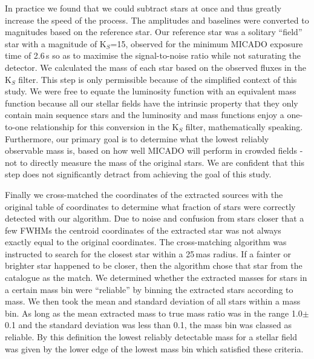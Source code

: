 In practice we found that we could subtract  stars at once and thus greatly increase the speed of the process. 
The amplitudes and baselines were converted to magnitudes based on the reference star. 
Our reference star was a solitary ``field'' star with a magnitude of K$_S$=15, observed for the minimum {MICADO} exposure time of 2.6\,s so as to maximise the signal-to-noise ratio while not saturating the detector. 
We calculated the mass of each star based on the observed fluxes in the K$_S$ filter. 
This step is only permissible because of the simplified context of this study. 
We were free to equate the luminosity function with an equivalent mass function because all our stellar fields have the intrinsic property that they only contain main sequence stars and the luminosity and mass functions enjoy a one-to-one relationship for this conversion in the K$_S$ filter, mathematically speaking. 
Furthermore, our primary goal is to determine what the lowest reliably observable mass is, based on how well MICADO will perform in crowded fields - not to directly measure the mass of the original stars. 
We are confident that this step does not significantly detract from achieving the goal of this study.


Finally we cross-matched the coordinates of the extracted sources with the original table of coordinates to determine what fraction of stars were correctly detected with our algorithm. 
Due to noise and confusion from stars closer that a few FWHMs the centroid coordinates of the extracted star was not always exactly equal to the original coordinates. 
The cross-matching algorithm was instructed to search for the closest star within a 25\,mas radius. 
If a fainter or brighter star happened to be closer, then the algorithm chose that star from the catalogue as the match. 
We determined whether the extracted masses for stars in a certain mass bin were ``reliable'' by binning the extracted stars according to mass. 
We then took the mean and standard deviation of all stars within a mass bin. 
As long as the mean extracted mass to true mass ratio was in the range 1.0$\pm$0.1 and the standard deviation was less than 0.1, the mass bin was classed as reliable. 
By this definition the lowest reliably detectable mass for a stellar field was given by the lower edge of the lowest mass bin which satisfied these criteria.





































